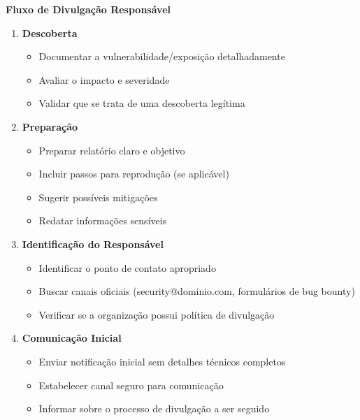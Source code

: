 \documentclass[12pt,a4paper]{book}
\begin{document}
\begin{mdframed}[backgroundcolor=verdeestabilidade!10, roundcorner=10pt, leftmargin=1cm, rightmargin=1cm]
\begin{center}
\textbf{\large Fluxo de Divulgação Responsável}
\end{center}

\begin{enumerate}
    \item \textbf{Descoberta}
    \begin{itemize}
        \item Documentar a vulnerabilidade/exposição detalhadamente
        \item Avaliar o impacto e severidade
        \item Validar que se trata de uma descoberta legítima
    \end{itemize}
    
    \item \textbf{Preparação}
    \begin{itemize}
        \item Preparar relatório claro e objetivo
        \item Incluir passos para reprodução (se aplicável)
        \item Sugerir possíveis mitigações
        \item Redatar informações sensíveis
    \end{itemize}
    
    \item \textbf{Identificação do Responsável}
    \begin{itemize}
        \item Identificar o ponto de contato apropriado
        \item Buscar canais oficiais (security@dominio.com, formulários de bug bounty)
        \item Verificar se a organização possui política de divulgação
    \end{itemize}
    
    \item \textbf{Comunicação Inicial}
    \begin{itemize}
        \item Enviar notificação inicial sem detalhes técnicos completos
        \item Estabelecer canal seguro para comunicação
        \item Informar sobre o processo de divulgação a ser seguido
    \end{itemize}
    

\end{enumerate}
\end{mdframed}
\end{document}
